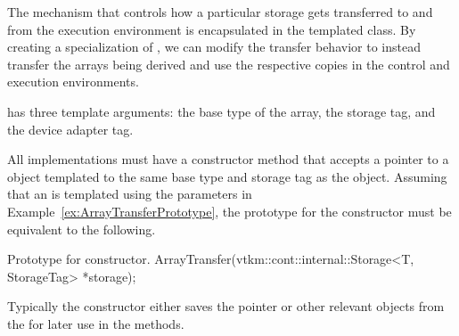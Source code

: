 
The mechanism that controls how a particular storage gets
transferred to and from the execution environment is encapsulated in the
templated  class. By creating a
specialization of , we can modify the
transfer behavior to instead transfer the arrays being derived and use the
respective copies in the control and execution environments.

 has three template arguments: the base type
of the array, the storage tag, and the device adapter tag.


All  implementations must have a
constructor method that accepts a pointer to a 
object templated to the same base type and storage tag as the
 object. Assuming that an
 is templated using the parameters in
Example~\ref{ex:ArrayTransferPrototype}, the prototype for the constructor
must be equivalent to the following.
\begin{vtkmexample}{Prototype for  constructor.}
ArrayTransfer(vtkm::cont::internal::Storage<T, StorageTag> *storage);
\end{vtkmexample}
Typically the constructor either saves the  pointer
or other relevant objects from the  for later use in
the methods.

